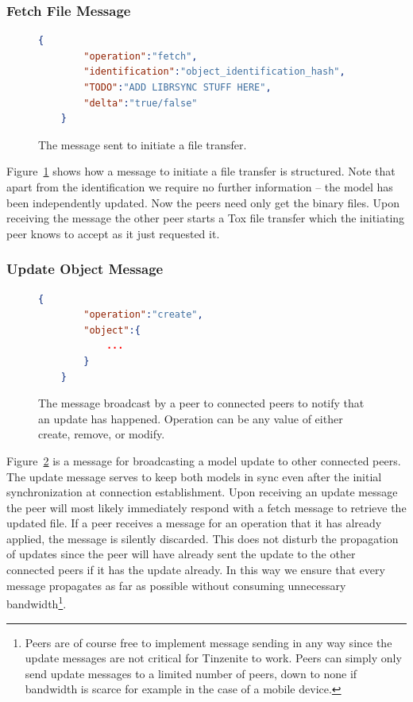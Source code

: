 \subsubsection{Fetch File Message}

\begin{figure}[htp]
    \begin{lstlisting}[language=json,firstnumber=0]
    {
        "operation":"fetch",
        "identification":"object_identification_hash",
        "TODO":"ADD LIBRSYNC STUFF HERE",
        "delta":"true/false"
    }
    \end{lstlisting}
\caption[Fetch Object Message]{The message sent to initiate a file transfer.}
\label{json:fetch_file}
\end{figure}

Figure~\ref{json:fetch_file} shows how a message to initiate a file transfer is structured.
Note that apart from the identification we require no further information – the model has been independently updated.
Now the peers need only get the binary files.
Upon receiving the message the other peer starts a Tox file transfer which the initiating peer knows to accept as it just requested it.

\subsubsection{Update Object Message}
\label{subs:Update Object Message}

\begin{figure}[htp]
    \begin{lstlisting}[language=json,firstnumber=0]
    {
        "operation":"create",
        "object":{
            ...
        }
    }
    \end{lstlisting}
\caption[Update Object Message]{The message broadcast by a peer to connected peers to notify that an update has happened. Operation can be any value of either create, remove, or modify.}
\label{json:update_object}
\end{figure}

Figure~\ref{json:update_object} is a message for broadcasting a model update to other connected peers.
The update message serves to keep both models in sync even after the initial synchronization at connection establishment.
Upon receiving an update message the peer will most likely immediately respond with a fetch message to retrieve the updated file.
If a peer receives a message for an operation that it has already applied, the message is silently discarded.
This does not disturb the propagation of updates since the peer will have already sent the update to the other connected peers if it has the update already.
In this way we ensure that every message propagates as far as possible without consuming unnecessary bandwidth\footnote{Peers are of course free to implement message sending in any way since the update messages are not critical for Tinzenite to work. Peers can simply only send update messages to a limited number of peers, down to none if bandwidth is scarce for example in the case of a mobile device.}.

